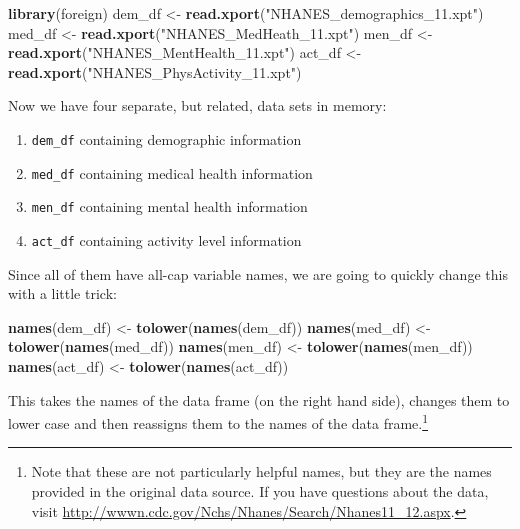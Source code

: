 \documentclass[]{tufte-book}
\newenvironment{Shaded}{}{}
\newcommand{\KeywordTok}[1]{\textcolor[rgb]{0.00,0.44,0.13}{\textbf{#1}}}
\newcommand{\StringTok}[1]{\textcolor[rgb]{0.25,0.44,0.63}{#1}}
\newcommand{\NormalTok}[1]{#1}
\providecommand{\tightlist}{%
  \setlength{\itemsep}{0pt}\setlength{\parskip}{0pt}}
\theoremstyle{definition}
\theoremstyle{definition}
\theoremstyle{remark}
\begin{document}
\begin{Shaded}
\begin{Highlighting}[]
\KeywordTok{library}\NormalTok{(foreign)}
\NormalTok{dem_df <-}\StringTok{ }\KeywordTok{read.xport}\NormalTok{(}\StringTok{"NHANES_demographics_11.xpt"}\NormalTok{)}
\NormalTok{med_df <-}\StringTok{ }\KeywordTok{read.xport}\NormalTok{(}\StringTok{"NHANES_MedHeath_11.xpt"}\NormalTok{)}
\NormalTok{men_df <-}\StringTok{ }\KeywordTok{read.xport}\NormalTok{(}\StringTok{"NHANES_MentHealth_11.xpt"}\NormalTok{)}
\NormalTok{act_df <-}\StringTok{ }\KeywordTok{read.xport}\NormalTok{(}\StringTok{"NHANES_PhysActivity_11.xpt"}\NormalTok{)}
\end{Highlighting}
\end{Shaded}

Now we have four separate, but related, data sets in memory:

\begin{enumerate}
\def\labelenumi{\arabic{enumi}.}
\tightlist
\item
  \texttt{dem\_df} containing demographic information
\item
  \texttt{med\_df} containing medical health information
\item
  \texttt{men\_df} containing mental health information
\item
  \texttt{act\_df} containing activity level information
\end{enumerate}

Since all of them have all-cap variable names, we are going to quickly
change this with a little trick:

\begin{Shaded}
\begin{Highlighting}[]
\KeywordTok{names}\NormalTok{(dem_df) <-}\StringTok{ }\KeywordTok{tolower}\NormalTok{(}\KeywordTok{names}\NormalTok{(dem_df))}
\KeywordTok{names}\NormalTok{(med_df) <-}\StringTok{ }\KeywordTok{tolower}\NormalTok{(}\KeywordTok{names}\NormalTok{(med_df))}
\KeywordTok{names}\NormalTok{(men_df) <-}\StringTok{ }\KeywordTok{tolower}\NormalTok{(}\KeywordTok{names}\NormalTok{(men_df))}
\KeywordTok{names}\NormalTok{(act_df) <-}\StringTok{ }\KeywordTok{tolower}\NormalTok{(}\KeywordTok{names}\NormalTok{(act_df))}
\end{Highlighting}
\end{Shaded}

This takes the names of the data frame (on the right hand side), changes
them to lower case and then reassigns them to the names of the data
frame.\footnote{Note that these are not particularly helpful names, but
  they are the names provided in the original data source. If you have
  questions about the data, visit
  \url{http://wwwn.cdc.gov/Nchs/Nhanes/Search/Nhanes11_12.aspx}.}
\end{document}
